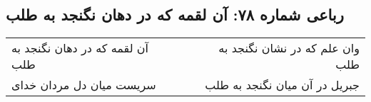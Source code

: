 \begin{center}
\section*{رباعی شماره ۷۸: آن لقمه که در دهان نگنجد به طلب}
\label{sec:0078}
\begin{longtable}{l p{0.5cm} r}
آن لقمه که در دهان نگنجد به طلب
&&
وان علم که در نشان نگنجد به طلب
\\
سریست میان دل مردان خدای
&&
جبریل در آن میان نگنجد به طلب
\\
\end{longtable}
\end{center}

